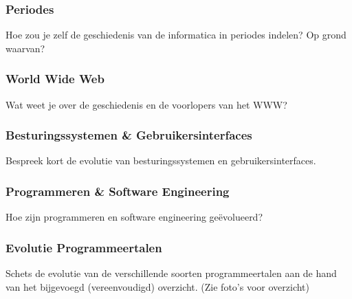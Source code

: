 \documentclass[../main.tex]{subfiles}
\begin{document}
\subsubsection{Periodes}
\begin{question}
Hoe zou je zelf de geschiedenis van de informatica in periodes indelen? Op grond waarvan?
\end{question}

\subsubsection{World Wide Web}
\begin{question}
Wat weet je over de geschiedenis en de voorlopers van het WWW?
\end{question}

\subsubsection{Besturingssystemen \& Gebruikersinterfaces}
\begin{question}
Bespreek kort de evolutie van besturingssystemen en gebruikersinterfaces.
\end{question}

\subsubsection{Programmeren \& Software Engineering}
\begin{question}
Hoe zijn programmeren en software engineering geëvolueerd?
\end{question}

\subsubsection{Evolutie Programmeertalen}
\begin{question}
Schets de evolutie van de verschillende soorten programmeertalen aan de hand van het bijgevoegd (vereenvoudigd) overzicht. (Zie foto's voor overzicht)
\end{question}
\end{document}
